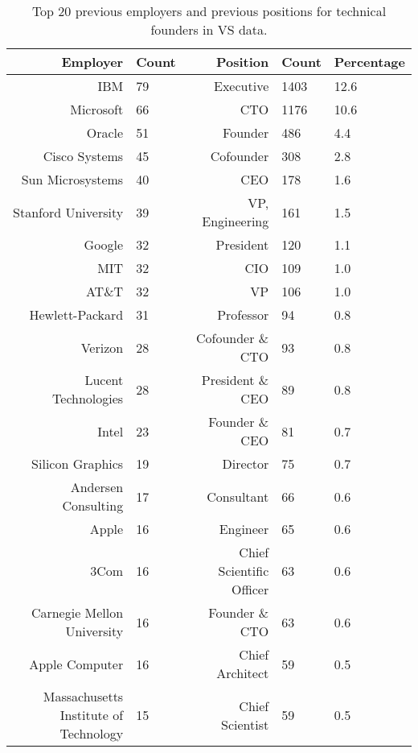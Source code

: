 \begin{table}[]
\centering
\begingroup\normalsize
\begin{tabular}{rlrll}
  \toprule
Employer & Count & Position & Count & Percentage \\ 
  \midrule
IBM & 79 & Executive & 1403 & 12.6 \\ 
  Microsoft & 66 & CTO & 1176 & 10.6 \\ 
  Oracle & 51 & Founder & 486 & 4.4 \\ 
  Cisco Systems & 45 & Cofounder & 308 & 2.8 \\ 
  Sun Microsystems & 40 & CEO & 178 & 1.6 \\ 
  Stanford University & 39 & VP, Engineering & 161 & 1.5 \\ 
  Google & 32 & President & 120 & 1.1 \\ 
  MIT & 32 & CIO & 109 & 1.0 \\ 
  AT\&T & 32 & VP & 106 & 1.0 \\ 
  Hewlett-Packard & 31 & Professor & 94 & 0.8 \\ 
  Verizon & 28 & Cofounder \& CTO & 93 & 0.8 \\ 
  Lucent Technologies & 28 & President \& CEO & 89 & 0.8 \\ 
  Intel & 23 & Founder \& CEO & 81 & 0.7 \\ 
  Silicon Graphics & 19 & Director & 75 & 0.7 \\ 
  Andersen Consulting & 17 & Consultant & 66 & 0.6 \\ 
  Apple & 16 & Engineer & 65 & 0.6 \\ 
  3Com & 16 & Chief Scientific Officer & 63 & 0.6 \\ 
  Carnegie Mellon University & 16 & Founder \& CTO & 63 & 0.6 \\ 
  Apple Computer & 16 & Chief Architect & 59 & 0.5 \\ 
  Massachusetts Institute of Technology & 15 & Chief Scientist & 59 & 0.5 \\ 
   \bottomrule
\end{tabular}
\endgroup
\caption{Top 20 previous employers and previous positions for technical founders in VS data.} 
\label{table:VS_previousEmployersSummaryTable}
\end{table}
